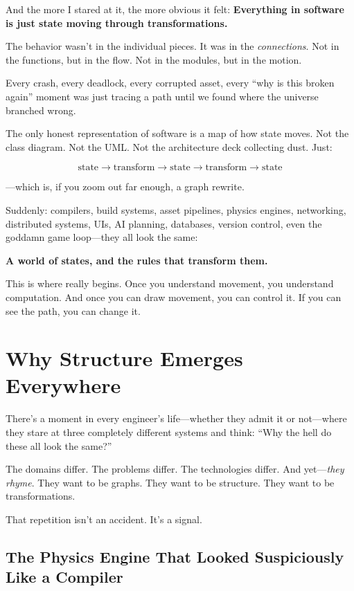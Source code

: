 And the more I stared at it, the more obvious it felt: \textbf{Everything in software is just state moving through transformations.}

The behavior wasn’t in the individual pieces. It was in the \textit{connections}.  
Not in the functions, but in the flow.  
Not in the modules, but in the motion.

Every crash, every deadlock, every corrupted asset, every “why is this broken again” moment was just tracing a path until we found where the universe branched wrong.

The only honest representation of software is a map of how state moves.  
Not the class diagram.  
Not the UML.  
Not the architecture deck collecting dust.  
Just:

\[
\text{state} \rightarrow \text{transform} \rightarrow \text{state} \rightarrow \text{transform} \rightarrow \text{state}
\]

—which is, if you zoom out far enough, a graph rewrite.

Suddenly: compilers, build systems, asset pipelines, physics engines, networking, distributed systems, UIs, AI planning, databases, version control, even the goddamn game loop—they all look the same:

\textbf{A world of states, and the rules that transform them.}

This is where \COMPUTER{} really begins. Once you understand movement, you understand computation. And once you can draw movement, you can control it. If you can see the path, you can change it.

\section{Why Structure Emerges Everywhere}
\label{sec:why-structure-emerges}

There’s a moment in every engineer’s life—whether they admit it or not—where they stare at three completely different systems and think: ``Why the hell do these all look the same?''

The domains differ. The problems differ. The technologies differ. And yet—\textit{they rhyme}. They want to be graphs. They want to be structure. They want to be transformations.

That repetition isn’t an accident. It’s a signal.

\subsection{The Physics Engine That Looked Suspiciously Like a Compiler}

